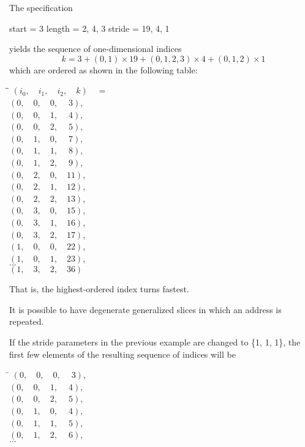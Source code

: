 \pnum
\begin{example}
The
specification
\begin{codeblock}
start  = 3
length = {2, 4, 3}
stride = {19, 4, 1}
\end{codeblock}
yields the sequence of one-dimensional indices
\[ k = 3 + (0, 1) \times 19 + (0, 1, 2, 3) \times 4 + (0, 1, 2) \times 1 \]
which are ordered as shown in the following table:

\begin{tabbing}
\hspace{.5in}\=\hspace{.4in}\=\kill%
\>$(i_0,\quad i_1,\quad i_2,\quad k)\quad =$\\
\>\>$(0,\quad 0,\quad 0,\quad \ 3)$,    \\
\>\>$(0,\quad 0,\quad 1,\quad \ 4)$,    \\
\>\>$(0,\quad 0,\quad 2,\quad \ 5)$,    \\
\>\>$(0,\quad 1,\quad 0,\quad \ 7)$,    \\
\>\>$(0,\quad 1,\quad 1,\quad \ 8)$,    \\
\>\>$(0,\quad 1,\quad 2,\quad \ 9)$,    \\
\>\>$(0,\quad 2,\quad 0,\quad 11)$, \\
\>\>$(0,\quad 2,\quad 1,\quad 12)$, \\
\>\>$(0,\quad 2,\quad 2,\quad 13)$, \\
\>\>$(0,\quad 3,\quad 0,\quad 15)$, \\
\>\>$(0,\quad 3,\quad 1,\quad 16)$, \\
\>\>$(0,\quad 3,\quad 2,\quad 17)$, \\
\>\>$(1,\quad 0,\quad 0,\quad 22)$, \\
\>\>$(1,\quad 0,\quad 1,\quad 23)$, \\
\>\>$\ldots$      \\
\>\>$(1,\quad 3,\quad 2,\quad 36)$
\end{tabbing}

That is, the highest-ordered index turns fastest.
\end{example}

\pnum
It is possible to have degenerate generalized slices in which an address
is repeated.

\pnum
\begin{example}
If the stride parameters in the previous
example are changed to \{1, 1, 1\}, the first few elements of the
resulting sequence of indices will be

\begin{tabbing}
\hspace{.9in}\=\kill%
\>$(0,\quad 0,\quad 0,\quad \ 3)$,  \\
\>$(0,\quad 0,\quad 1,\quad \ 4)$,  \\
\>$(0,\quad 0,\quad 2,\quad \ 5)$,  \\
\>$(0,\quad 1,\quad 0,\quad \ 4)$,  \\
\>$(0,\quad 1,\quad 1,\quad \ 5)$,  \\
\>$(0,\quad 1,\quad 2,\quad \ 6)$,  \\
\>$\ldots$
\end{tabbing}
\end{example}

